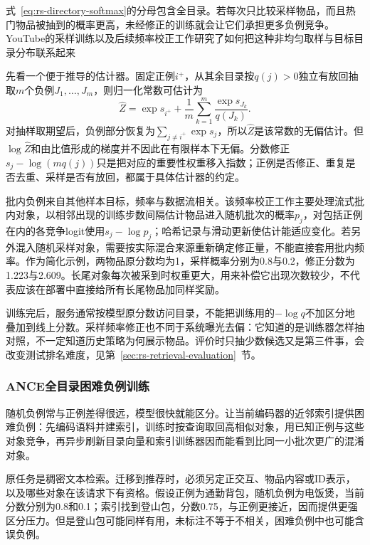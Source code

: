 式~\eqref{eq:rs-directory-softmax}的分母包含全目录。若每次只比较采样物品，而且热门物品被抽到的概率更高，未经修正的训练就会让它们承担更多负例竞争。YouTube的采样训练以及后续频率校正工作研究了如何把这种非均匀取样与目标目录分布联系起来

先看一个便于推导的估计器。固定正例$i^+$，从其余目录按$q(j)>0$独立有放回抽取$m$个负例$J_1,\ldots,J_m$，则归一化常数可估计为
\begin{equation}
 \widehat Z=\exp s_{i^+}
       +\frac1m\sum_{k=1}^{m}\frac{\exp s_{J_k}}{q(J_k)}.
 \label{eq:rs-softmax-estimator}
\end{equation}
对抽样取期望后，负例部分恢复为$\sum_{j\ne i^+}\exp s_j$，所以$\widehat Z$是该常数的无偏估计。但$\log\widehat Z$和由比值形成的梯度并不因此在有限样本下无偏。分数修正$s_j-\log(mq(j))$只是把对应的重要性权重移入指数；正例是否修正、重复是否去重、采样是否有放回，都属于具体估计器的约定。

批内负例来自其他样本目标，频率与数据流相关。该频率校正工作主要处理流式批内对象，以相邻出现的训练步数间隔估计物品进入随机批次的概率$p_j$，对包括正例在内的各竞争logit使用$s_j-\log p_j$；哈希记录与滑动更新使估计能适应变化。若另外混入随机采样对象，需要按实际混合来源重新确定修正量，不能直接套用批内频率。作为简化示例，两物品原分数均为1，采样概率分别为0.8与0.2，修正分数为1.223与2.609。长尾对象每次被采到时权重更大，用来补偿它出现次数较少，不代表应该在部署中直接给所有长尾物品加同样奖励。

训练完后，服务通常按模型原分数访问目录，不能把训练用的$-\log q$不加区分地叠加到线上分数。采样频率修正也不同于系统曝光去偏：它知道的是训练器怎样抽对照，不一定知道历史策略为何展示物品。评价时只抽少数候选又是第三件事，会改变测试排名难度，见第~\ref{sec:rs-retrieval-evaluation}~节。

\Needspace{85mm}
\subsubsection{ANCE全目录困难负例训练}
\label{sec:rs-ance}

随机负例常与正例差得很远，模型很快就能区分。让当前编码器的近邻索引提供困难负例：先编码语料并建索引，训练时按查询取回高相似对象，用已知正例与这些对象竞争，再异步刷新目录向量和索引训练器因而能看到比同一小批次更广的混淆对象。

原任务是稠密文本检索。迁移到推荐时，必须另定正交互、物品内容或ID表示，以及哪些对象在该请求下有资格。假设正例为通勤背包，随机负例为电饭煲，当前分数分别为0.8和0.1；索引找到登山包，分数0.75，与正例更接近，因而提供更强区分压力。但是登山包可能同样有用，未标注不等于不相关，困难负例中也可能含误负例。

